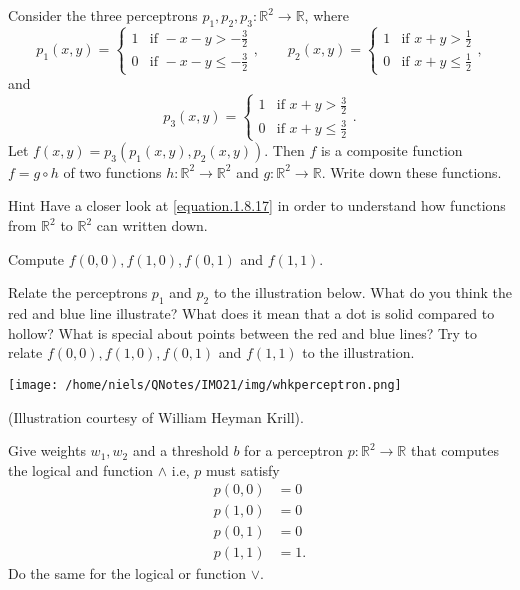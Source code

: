 \begin{exercise}\label{perceptronex}
  Consider the three perceptrons $p_1, p_2, p_3: \mathbb{R}^2\rightarrow \mathbb{R}$, where
  $$
    p_1(x, y) =
    \begin{cases}
      1 & \text{if } -x-y > -\frac{3}{2}    \\
      0 & \text{if } -x-y \leq -\frac{3}{2}
    \end{cases},
    \qquad
    p_2(x, y) =
    \begin{cases}
      1 & \text{if } x + y > \frac{1}{2}    \\
      0 & \text{if } x + y \leq \frac{1}{2}
    \end{cases},
  $$
  and
  $$
    p_3(x, y) =
    \begin{cases}
      1 & \text{if } x + y > \frac{3}{2}    \\
      0 & \text{if } x + y \leq \frac{3}{2}
    \end{cases}.
  $$
  Let $f(x, y) = p_3 (p_1(x, y), p_2(x, y))$. Then $f$ is
  a composite function $f = g\circ h$ of two functions $h: \mathbb{R}^2\rightarrow \mathbb{R}^2$
  and $g: \mathbb{R}^2\rightarrow \mathbb{R}$. Write down these functions.

  \begin{button}{Hint}
    Have a closer look at \eqref{equation.1.8.17} in order to understand how
    functions from $\mathbb{R}^2$ to $\mathbb{R}^2$ can written down.
  \end{button}

  Compute
  $f(0, 0), f(1, 0), f(0, 1)$ and $f(1, 1)$.

  Relate the perceptrons $ p_1 $ and $ p_2 $ to the illustration
  below. What do you think the red and blue line illustrate?  What does
  it mean that a dot is solid compared to hollow? What is special
  about points between the red and blue lines?  Try to relate $f(0,0),
    f(1,0), f(0,1)$ and $f(1,1)$ to the illustration.

  \begin{center}\texttt{[image: /home/niels/QNotes/IMO21/img/whkperceptron.png]}\end{center}

  (Illustration courtesy of William Heyman Krill).

\end{exercise}

\begin{exercise}
  Give weights $w_1, w_2$ and a threshold $b$ for a perceptron $p:\mathbb{R}^2\rightarrow \mathbb{R}$ that computes
  the logical and function $\land$ i.e, $p$ must satisfy
  \begin{align*}
    p(0,0)  & = 0  \\
    p(1, 0) & = 0  \\
    p(0,1)  & = 0  \\
    p(1, 1) & = 1.
  \end{align*}
  Do the same for the logical or function $\lor$.
\end{exercise}

